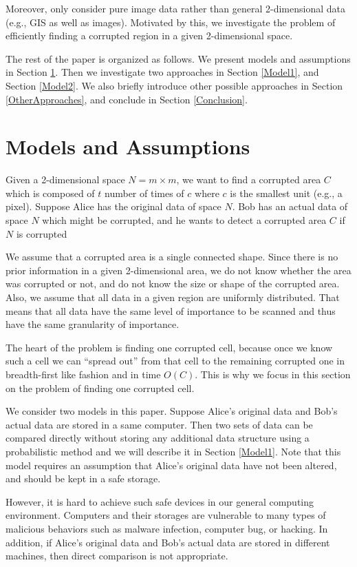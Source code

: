 \documentclass{llncs}
\begin{document}
Moreover, \cite{ZaMu07} only consider pure image data 
rather than general 2-dimensional data (e.g., GIS as well as images). 
Motivated by this, we investigate the problem of efficiently finding a corrupted region
in a given 2-dimensional space.

The rest of the paper is organized as follows. 
We present models and assumptions in Section \ref{ModelsAndAssumptions}.
Then we investigate two approaches in Section \ref{Model1}, 
and Section \ref{Model2}.
We also briefly introduce other possible approaches in Section \ref{OtherApproaches},
and conclude in Section \ref{Conclusion}.

\section{Models and Assumptions}
\label{ModelsAndAssumptions}
Given a 2-dimensional space $N = m \times m$, we want to find a corrupted area $C$
which is composed of $t$ number of times of $c$ where $c$ is the smallest unit (e.g., a pixel).
Suppose Alice has the original data of space $N$.
Bob has an actual data of space $N$ which might be corrupted,
and he wants to detect a corrupted area $C$ if $N$ is corrupted 

We assume that a corrupted area is a single connected shape.
Since there is no prior information in a given 2-dimensional area,
we do not know whether the area was corrupted or not, and   
do not know the size or shape of the corrupted area.
Also, we assume that all data in a given region are uniformly distributed.
That means that all data have the same level of importance to be scanned 
and thus have the same granularity of importance.

The heart of the problem
is finding one corrupted cell, because once we
know such a cell we can ``spread out'' from that cell 
to the remaining corrupted one in breadth-first like fashion
and in time $O(C)$.
This is why we focus in this section on the problem of
finding one corrupted cell.

We consider two models in this paper. 
Suppose Alice's original data and Bob's actual data are stored in a same computer.
Then two sets of data can be compared directly without storing any additional data structure
using a probabilistic method and we will describe it in Section \ref{Model1}.
Note that this model requires an assumption that Alice's original data have not been altered, 
and should be kept in a safe storage.

However, it is hard to achieve such safe devices in our general computing environment.
Computers and their storages are vulnerable to many types of malicious behaviors
such as malware infection, computer bug, or hacking.    
In addition, if Alice's original data and Bob's actual data are stored in different machines, 
then direct comparison is not appropriate. 
\end{document}
